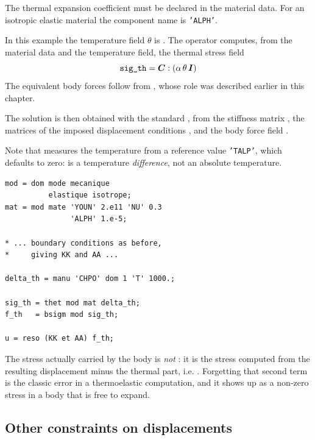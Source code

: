 \begin{castemcom}
The thermal expansion coefficient must be declared in the material data. For
an isotropic elastic material the component name is \texttt{'ALPH'}.

\medskip
In this example the temperature field $\theta$ is . The operator
  computes, from the
material data and the temperature field, the thermal stress field
\[ \texttt{sig\_th} = \bm{C} : \left( \alpha\,\theta\,\bm{I} \right) \]
The equivalent body forces follow from , whose role was described
earlier in this chapter.

The solution is then obtained with the standard , from the
stiffness matrix , the matrices of the imposed displacement conditions
, and the body force field .

\medskip
Note that  measures the temperature from a reference value
\texttt{'TALP'}, which defaults to zero:  is a temperature
\emph{difference}, not an absolute temperature.
\end{castemcom}
\begin{castemlines}
\begin{verbatim}
mod = dom mode mecanique
          elastique isotrope;
mat = mod mate 'YOUN' 2.e11 'NU' 0.3
               'ALPH' 1.e-5;

* ... boundary conditions as before,
*     giving KK and AA ...

delta_th = manu 'CHPO' dom 1 'T' 1000.;

sig_th = thet mod mat delta_th;
f_th   = bsigm mod sig_th;

u = reso (KK et AA) f_th;
\end{verbatim}
\end{castemlines}

\noindent The stress actually carried by the body is \emph{not} :
it is the stress computed from the resulting displacement minus the thermal
part, i.e. . Forgetting that second term is the
classic error in a thermoelastic computation, and it shows up as a non-zero
stress in a body that is free to expand.

\subsection{Other constraints on displacements}
\label{sec:elas:rela}

